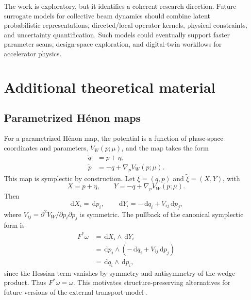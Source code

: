 \documentclass[11pt,a4paper]{article}
\providecommand{\dd}{\,\mathrm{d}}
\begin{document}
\begin{sloppypar}
The work is exploratory, but it identifies a coherent research direction. Future surrogate models for collective beam dynamics should combine latent probabilistic representations, directed/local operator kernels, physical constraints, and uncertainty quantification. Such models could eventually support faster parameter scans, design-space exploration, and digital-twin workflows for accelerator physics.

\newpage
\printbibliography

\appendix
\section{Additional theoretical material}

\subsection{Parametrized H\'enon maps}
For a parametrized H\'enon map, the potential is a function of phase-space coordinates and parameters, $V_W(p;\mu)$, and the map takes the form
\begin{equation}
\begin{aligned}
    \widetilde{q}&=p+\eta,\\
    \widetilde{p}&=-q+\nabla_p V_W(p;\mu).
\end{aligned}
\end{equation}
This map is symplectic by construction. Let $\xi=(q,p)$ and $\widetilde{\xi}=(X,Y)$, with
\begin{equation}
    X=p+\eta,\qquad Y=-q+\nabla_pV_W(p;\mu).
\end{equation}
Then
\begin{equation}
    \dd X_i=\dd p_i,\qquad \dd Y_i=-\dd q_i+V_{ij}\dd p_j,
\end{equation}
where $V_{ij}=\partial^2 V_W/\partial p_i\partial p_j$ is symmetric. The pullback of the canonical symplectic form is
\begin{equation}
\begin{aligned}
    F^*\omega&=\dd X_i\wedge \dd Y_i\\
    &=\dd p_i\wedge(-\dd q_i+V_{ij}\dd p_j)\\
    &=\dd q_i\wedge\dd p_i,
\end{aligned}
\end{equation}
since the Hessian term vanishes by symmetry and antisymmetry of the wedge product. Thus $F^*\omega=\omega$. This motivates structure-preserving alternatives for future versions of the external transport model \cite{burby_fast_2020,huang_symplectic_2024}.


\end{sloppypar}
\end{document}
